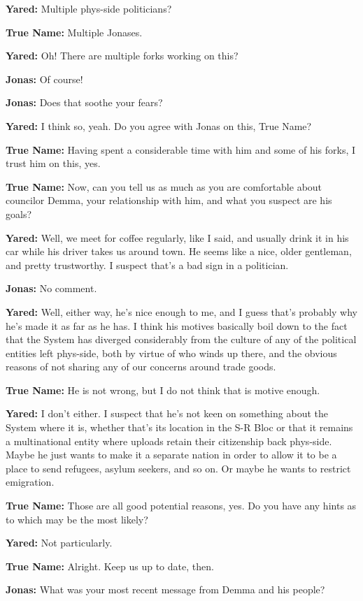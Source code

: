 \textbf{Yared:} Multiple phys-side politicians?

\textbf{True Name:} Multiple Jonases.

\textbf{Yared:} Oh! There are multiple forks working on this?

\textbf{Jonas:} Of course!

\textbf{Jonas:} Does that soothe your fears?

\textbf{Yared:} I think so, yeah. Do you agree with Jonas on this, True Name?

\textbf{True Name:} Having spent a considerable time with him and some of his forks, I trust him on this, yes.

\textbf{True Name:} Now, can you tell us as much as you are comfortable about councilor Demma, your relationship with him, and what you suspect are his goals?

\textbf{Yared:} Well, we meet for coffee regularly, like I said, and usually drink it in his car while his driver takes us around town. He seems like a nice, older gentleman, and pretty trustworthy. I suspect that's a bad sign in a politician.

\textbf{Jonas:} No comment.

\textbf{Yared:} Well, either way, he's nice enough to me, and I guess that's probably why he's made it as far as he has. I think his motives basically boil down to the fact that the System has diverged considerably from the culture of any of the political entities left phys-side, both by virtue of who winds up there, and the obvious reasons of not sharing any of our concerns around trade goods.

\textbf{True Name:} He is not wrong, but I do not think that is motive enough.

\textbf{Yared:} I don't either. I suspect that he's not keen on something about the System where it is, whether that's its location in the S-R Bloc or that it remains a multinational entity where uploads retain their citizenship back phys-side. Maybe he just wants to make it a separate nation in order to allow it to be a place to send refugees, asylum seekers, and so on. Or maybe he wants to restrict emigration.

\textbf{True Name:} Those are all good potential reasons, yes. Do you have any hints as to which may be the most likely?

\textbf{Yared:} Not particularly.

\textbf{True Name:} Alright. Keep us up to date, then.

\textbf{Jonas:} What was your most recent message from Demma and his people?

